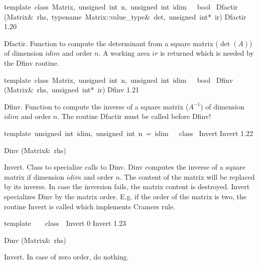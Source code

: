 \documentclass{article}
\begin{document}
\begin{cxxentry}
\begin{cxxfunction}
\begin{cxxdoc}
\end{cxxdoc}
\end{cxxfunction}
\begin{cxxfunction}
{template\ \<class\ Matrix,\ unsigned\ int\ n,\ unsigned\ int\ idim\>\ \ \ bool\ }
        {Dfactir}
        {(Matrix\&\ rhs,\ typename\ Matrix::value\_type\&\ det,\ unsigned\ int*\ ir)}
        {Dfactir}
        {1.20}
\begin{cxxdoc}
Dfactir.
Function to compute the determinant from a square matrix ($\det(A)$) of
dimension $idim$ and order $n$. A working area $ir$ is returned which is
needed by the Dfinv routine.


\end{cxxdoc}
\end{cxxfunction}
\begin{cxxfunction}
{template\ \<class\ Matrix,\ unsigned\ int\ n,\ unsigned\ int\ idim\>\ \ \ bool\ }
        {Dfinv}
        {(Matrix\&\ rhs,\ unsigned\ int*\ ir)}
        {Dfinv}
        {1.21}
\begin{cxxdoc}
Dfinv.
Function to compute the inverse of a square matrix ($A^{-1}$) of
dimension $idim$ and order $n$. The routine Dfactir must be called
before Dfinv!


\end{cxxdoc}
\end{cxxfunction}
\begin{cxxclass}
{template\ \<unsigned\ int\ idim,\ unsigned\ int\ n\ =\ idim\>\ \ \ class\ }
        {Invert}
        {}
        {Invert}
        {1.22}
\begin{cxxpublic}
        {Dinv}
        {(Matrix\&\ rhs)}
        {}
        {}
\label{cxx.1.22.1}
\end{cxxpublic}
\begin{cxxdoc}
Invert.
Class to specialize calls to Dinv. Dinv computes the inverse of a square
matrix if dimension $idim$ and order $n$. The content of the matrix will be
replaced by its inverse. In case the inversion fails, the matrix content is
destroyed. Invert specializes Dinv by the matrix order. E.g. if the order
of the matrix is two, the routine Invert\> is called which implements
Cramers rule.


\end{cxxdoc}
\end{cxxclass}
\begin{cxxclass}
{template\ \<\>\ \ \ class\ \ Invert}
        {0}
        {}
        {Invert\>}
        {1.23}
\begin{cxxpublic}
        {Dinv}
        {(Matrix\&\ rhs)}
        {}
        {}
\label{cxx.1.23.1}
\end{cxxpublic}
\begin{cxxdoc}
Invert\>.
In case of zero order, do nothing.



\end{cxxdoc}
\end{cxxclass}
\end{cxxentry}
\end{document}
